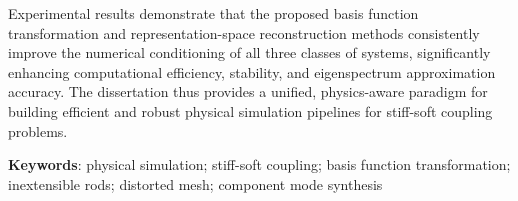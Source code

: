 Experimental results demonstrate that the proposed basis function transformation and representation-space reconstruction methods consistently improve the numerical conditioning of all three classes of systems, significantly enhancing computational efficiency, stability, and eigenspectrum approximation accuracy. The dissertation thus provides a unified, physics-aware paradigm for building efficient and robust physical simulation pipelines for stiff-soft coupling problems.

\bigskip
\noindent \textbf{Keywords}: physical simulation; stiff-soft coupling; basis function transformation; inextensible rods; distorted mesh; component mode synthesis
